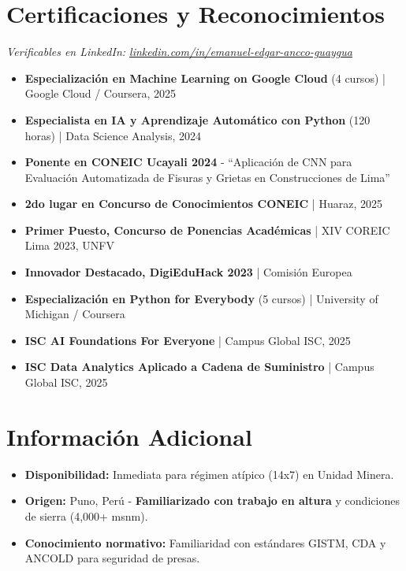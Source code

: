 \documentclass[10pt, a4paper]{article}
\begin{document}
\section*{Certificaciones y Reconocimientos}
\textit{\small Verificables en LinkedIn: \href{https://www.linkedin.com/in/emanuel-edgar-ancco-guaygua-a61210352}{linkedin.com/in/emanuel-edgar-ancco-guaygua}}
\vspace{1mm}
\begin{itemize}
    \item \textbf{Especialización en Machine Learning on Google Cloud} (4 cursos) | Google Cloud / Coursera, 2025
    \item \textbf{Especialista en IA y Aprendizaje Automático con Python} (120 horas) | Data Science Analysis, 2024
    \item \textbf{Ponente en CONEIC Ucayali 2024} - ``Aplicación de CNN para Evaluación Automatizada de Fisuras y Grietas en Construcciones de Lima''
    \item \textbf{2do lugar en Concurso de Conocimientos CONEIC} | Huaraz, 2025
    \item \textbf{Primer Puesto, Concurso de Ponencias Académicas} | XIV COREIC Lima 2023, UNFV
    \item \textbf{Innovador Destacado, DigiEduHack 2023} | Comisión Europea
    \item \textbf{Especialización en Python for Everybody} (5 cursos) | University of Michigan / Coursera
    \item \textbf{ISC AI Foundations For Everyone} | Campus Global ISC, 2025
    \item \textbf{ISC Data Analytics Aplicado a Cadena de Suministro} | Campus Global ISC, 2025
\end{itemize}

\section*{Información Adicional}
\begin{itemize}
    \item \textbf{Disponibilidad:} Inmediata para régimen atípico (14x7) en Unidad Minera.
    \item \textbf{Origen:} Puno, Perú - \textbf{Familiarizado con trabajo en altura} y condiciones de sierra (4,000+ msnm).
    \item \textbf{Conocimiento normativo:} Familiaridad con estándares GISTM, CDA y ANCOLD para seguridad de presas.
\end{itemize}
\end{document}
